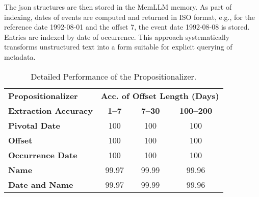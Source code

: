 \documentclass[11pt]{article}
\begin{document}
The json structures are then stored in the MemLLM memory. As
part of indexing, dates of events are computed and returned
in ISO format, e.g., for the reference date 1992-08-01 and the offset
7, the event date 1992-08-08 is stored.
Entries are indexed by date of occurrence.
This approach systematically transforms
unstructured text into a form suitable for 
explicit querying of metadata.








\begin{table}[ht]
\centering
\caption{Detailed Performance of the Propositionalizer.}
\label{tab:propositionalizer}
\begin{tabular}{l|ccc}
\hline
\textbf{Propositionalizer} & \multicolumn{3}{c}{\small{\textbf{Acc. of Offset Length (Days)}}} \\
\cline{2-4}
\small{\textbf{Extraction Accuracy}}  & \textbf{1--7 }  & \textbf{7--30 } & \textbf{100--200 } \\
\hline
\textbf{Pivotal Date} & 100 & 100 & 100 \\
\textbf{Offset} & 100 & 100 & 100 \\
\textbf{Occurrence Date} & 100 & 100 & 100 \\
\textbf{Name} & 99.97 & 99.99 & 99.96 \\
\textbf{Date and Name} & 99.97 & 99.99 & 99.96 \\
\hline
\end{tabular}
\end{table}
\end{document}
